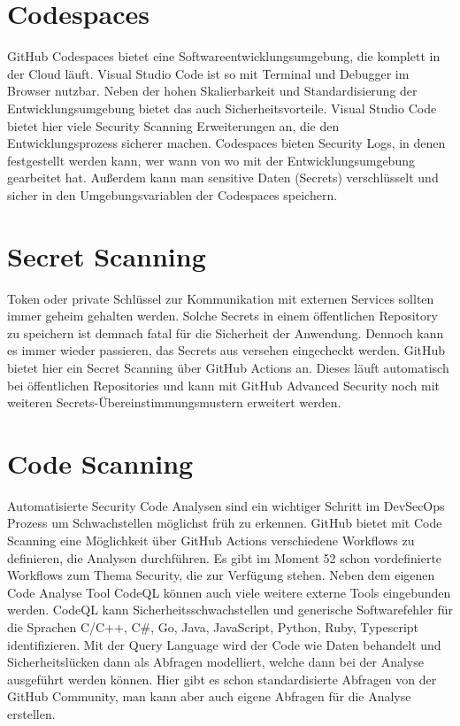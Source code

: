 \section{Codespaces}
GitHub Codespaces bietet eine Softwareentwicklungsumgebung, die komplett in der Cloud läuft. Visual Studio Code ist so mit Terminal und Debugger im Browser nutzbar. Neben der hohen Skalierbarkeit und Standardisierung der Entwicklungsumgebung bietet das auch Sicherheitsvorteile. Visual Studio Code bietet hier viele Security Scanning Erweiterungen an, die den Entwicklungsprozess sicherer machen. Codespaces bieten Security Logs, in denen festgestellt werden kann, wer wann von wo mit der Entwicklungsumgebung gearbeitet hat. \cite{codespaces-logs} Außerdem kann man sensitive Daten (Secrets) verschlüsselt und sicher in den Umgebungsvariablen der Codespaces speichern. \cite{codespaces-secrets}

\section{Secret Scanning}
Token oder private Schlüssel zur Kommunikation mit externen Services sollten immer geheim gehalten werden. Solche Secrets in einem öffentlichen Repository zu speichern ist demnach fatal für die Sicherheit der Anwendung. Dennoch kann es immer wieder passieren, das Secrets aus versehen eingecheckt werden. GitHub bietet hier ein Secret Scanning über GitHub Actions an. Dieses läuft automatisch bei öffentlichen Repositories und kann mit GitHub Advanced Security noch mit weiteren Secrets-Übereinstimmungsmustern erweitert werden. \cite{secret-scanning}

\section{Code Scanning}
Automatisierte Security Code Analysen sind ein wichtiger Schritt im DevSecOps Prozess um Schwachstellen möglichst früh zu erkennen. GitHub bietet mit Code Scanning eine Möglichkeit über GitHub Actions verschiedene Workflows zu definieren, die Analysen durchführen. Es gibt im Moment 52 schon vordefinierte Workflows zum Thema Security, die zur Verfügung stehen. Neben dem eigenen Code Analyse Tool CodeQL können auch viele weitere externe Tools eingebunden werden.\cite{code-scanning} CodeQL kann Sicherheitsschwachstellen und generische Softwarefehler für die Sprachen C/C++, C\#, Go, Java, JavaScript, Python, Ruby, Typescript identifizieren. Mit der Query Language wird der Code wie Daten behandelt und Sicherheitslücken dann als Abfragen modelliert, welche dann bei der Analyse ausgeführt werden können. Hier gibt es schon standardisierte Abfragen von der GitHub Community, man kann aber auch eigene Abfragen für die Analyse erstellen. \cite{codeql}

